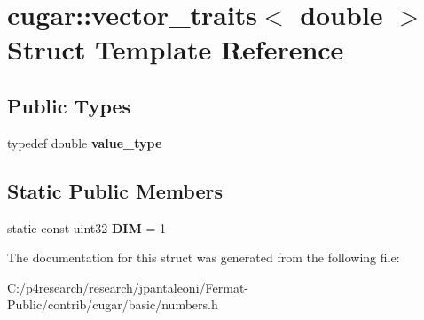\hypertarget{structcugar_1_1vector__traits_3_01double_01_4}{}\section{cugar\+:\+:vector\+\_\+traits$<$ double $>$ Struct Template Reference}
\label{structcugar_1_1vector__traits_3_01double_01_4}
\subsection*{Public Types}
\begin{DoxyCompactItemize}
\item 
\mbox{\label{structcugar_1_1vector__traits_3_01double_01_4_a045056b06d5a5afc4e5e1319c53fb62d}} 
typedef double {\bfseries value\+\_\+type}
\end{DoxyCompactItemize}
\subsection*{Static Public Members}
\begin{DoxyCompactItemize}
\item 
\mbox{\label{structcugar_1_1vector__traits_3_01double_01_4_a0973e48413108e2441ebea3588f9d8c2}} 
static const uint32 {\bfseries D\+IM} = 1
\end{DoxyCompactItemize}


The documentation for this struct was generated from the following file\+:\begin{DoxyCompactItemize}
\item 
C\+:/p4research/research/jpantaleoni/\+Fermat-\/\+Public/contrib/cugar/basic/numbers.\+h\end{DoxyCompactItemize}
